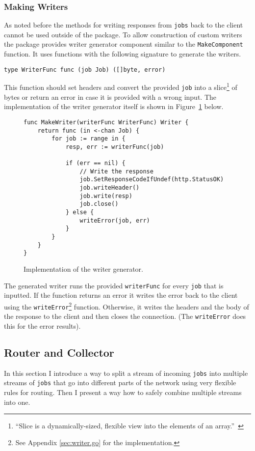 \subsubsection{Making Writers}
As noted before the methods for writing responses from \texttt{jobs}
back to the client cannot be used outside of the package. To allow
construction of custom writers the package provides writer generator
component similar to the \texttt{MakeComponent} function. It uses 
functions with the following signature to generate the writers.
\begin{lstlisting}
type WriterFunc func (job Job) ([]byte, error)
\end{lstlisting}
This function should set headers and convert the provided \texttt{job} into 
a slice\footnote{``Slice is a dynamically-sized, flexible view into the elements 
of an array.''~\cite{tour}} of bytes or return an error in case it 
is provided with a 
wrong input. The implementation of the writer generator itself is shown
in Figure~\ref{fig:MakeWriter} below.
\begin{figure}[h]
\centering
\begin{lstlisting}
func MakeWriter(writerFunc WriterFunc) Writer {
    return func (in <-chan Job) {
        for job := range in {
            resp, err := writerFunc(job)

            if (err == nil) {
                // Write the response
                job.SetResponseCodeIfUndef(http.StatusOK)
                job.writeHeader()
                job.write(resp)
                job.close()
            } else {
                writeError(job, err)
            }
        }       
    }
}
\end{lstlisting}
\caption[scale=1.0]{Implementation of the writer generator.}
\label{fig:MakeWriter}
\end{figure}

The generated writer runs the provided \texttt{writerFunc} for every \texttt{job} 
that is inputted. If the function returns an error it writes the error 
back to the client using the \texttt{writeError}\footnote{See Appendix 
\ref{sec:writer.go} for the implementation.} function. Otherwise, it 
writes the headers and the body of the response to the client and then 
closes the connection. (The \texttt{writeError} does this for the error
results).

\subsection{Router and Collector}
In this section I introduce a way to split a stream of incoming \texttt{jobs} into
multiple streams of \texttt{jobs} that go into different parts of the network
using very flexible rules for routing. Then I present a way how to
safely combine multiple streams into one.


